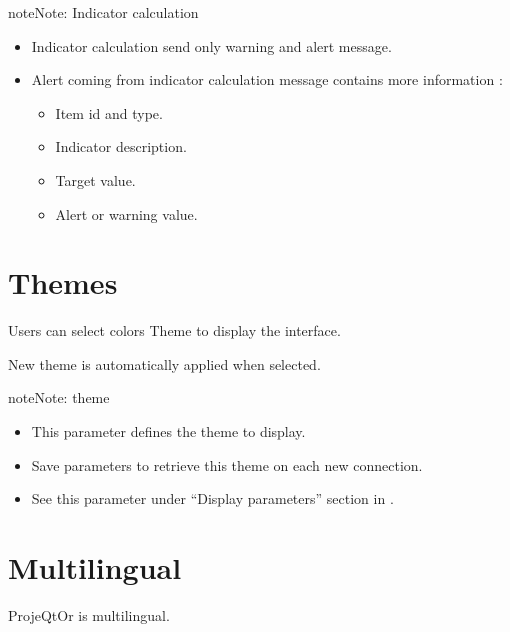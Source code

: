 \documentclass[letterpaper,10pt,english]{sphinxmanual}
\begin{document}
\begin{notice}{note}{Note:}
Indicator calculation
\begin{itemize}
\item {} 
Indicator calculation send only warning and alert message.

\item {} 
Alert coming from indicator calculation message contains more information :
\begin{itemize}
\item {} 
Item id and type.

\item {} 
Indicator description.

\item {} 
Target value.

\item {} 
Alert or warning value.

\end{itemize}

\end{itemize}
\end{notice}
\newpage

\section{Themes}
\label{Gui:themes}
Users can select colors Theme to display the interface.

New theme is automatically applied when selected.

\begin{notice}{note}{Note:}
theme
\begin{itemize}
\item {} 
This parameter defines the theme to display.

\item {} 
Save parameters to retrieve this theme on each new connection.

\item {} 
See this parameter under ``Display parameters'' section in {\hyperref[UserParameter:user-parameters-label]{\emph{}}}.

\end{itemize}
\end{notice}
\newpage

\section{Multilingual}
\label{Gui:multilingual}
ProjeQtOr is multilingual.
\end{document}

